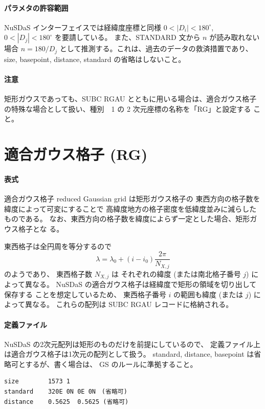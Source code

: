 \paragraph{パラメタの許容範囲}
NuSDaS インターフェイスでは経緯度座標と同様
\(0 < |D_i| < 180^\circ\),
\(0 < |D_j| < 180^\circ\)
を要請している。
また、STANDARD 文から $n$ が読み取れない場合
\(n = 180 / D_j\)
として推測する。これは、過去のデータの救済措置であり、size, basepoint,
distance, standard の省略はしないこと。
\paragraph{注意}
矩形ガウスであっても、SUBC RGAU とともに用いる場合は、適合ガウス格子
の特殊な場合として扱い、種別　1 の 2 次元座標の名称を「RG」と設定する
こと。

\section{適合ガウス格子 (RG)}

\paragraph{表式}
適合ガウス格子 reduced Gaussian grid は矩形ガウス格子の
東西方向の格子数を緯度によって可変にすることで
高緯度地方の格子密度を低緯度並みに減らしたものである。
なお、東西方向の格子数を緯度によらず一定とした場合、矩形ガウス格子とな
る。

東西格子は全円周を等分するので
\begin{equation}
 \lambda = \lambda_0 + (i - i_0) \frac{2\pi}{N_{X,j}}
\end{equation}
のようであり、
東西格子数 $N_{X,j}$ は
それぞれの緯度 (または南北格子番号 $j$) によって異なる。
NuSDaS の適合ガウス格子は経緯度で矩形の領域を切り出して保存する
ことを想定しているため、
東西格子番号 $i$ の範囲も緯度 (または $j$) によって異なる。
これらの配列は SUBC RGAU レコードに格納される。

\paragraph{定義ファイル}
NuSDaS の2次元配列は矩形のものだけを前提にしているので、
定義ファイル上は適合ガウス格子は1次元の配列として扱う。
standard, distance, basepoint は省略可とするが、書く場合は、
GS のルールに準拠すること。
\begin{screen}
\begin{verbatim}
size        1573 1
standard    320E 0N 0E 0N　(省略可)
distance    0.5625  0.5625 (省略可)
\end{verbatim}
\end{screen}

